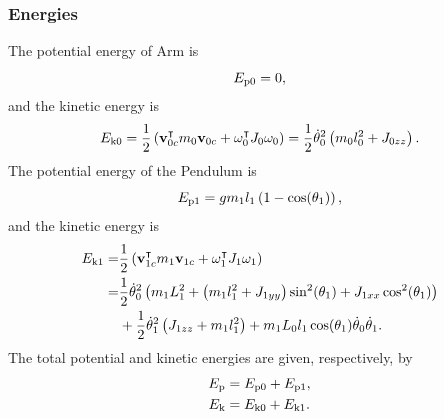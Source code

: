 \subsubsection{Energies}
The potential energy of Arm is
\begin{equation}
	E _{\text{p0}} = 0,
\end{equation}
and the kinetic energy is
\begin{equation}
	E _{\text{k0}} = \frac{1}{2}\left( \text{\textbf{v}}_{0c}^\intercal m_0\textbf{v}_{0c} + \omega_0^\intercal J_0\omega_0  \right) = 
	\frac{1}{2}\dot{\theta}_0^2\left(  m_0l_0^2+J_{0zz}  \right).
\end{equation}
The potential energy of the Pendulum is
\begin{equation}
E _{\text{p1}} = gm_1l_1\left( 1-\cos(\theta_1) \right),
\end{equation}
and the kinetic energy is
\begin{equation}
\begin{split}
	E _{\text{k1}} = &\frac{1}{2}\left( \text{\textbf{v}}_{1c}^\intercal m_1\textbf{v}_{1c} + \omega_1^\intercal J_1\omega_1  \right)\\
	= &\frac{1}{2}\dot{\theta}_0^2\left( m_1L_1^2+\left( m_1l_1^2+J_{1yy} \right)\sin^2(\theta_1)+J_{1xx}\cos^2(\theta_1) \right)\\
	&+\frac{1}{2}\dot{\theta}_1^2\left(  J_{1zz}+m_1l_1^2  \right)+m_1L_0l_1\cos(\theta_1)\dot{\theta}_0\dot{\theta}_1.
\end{split}
\end{equation}
The total potential and kinetic energies are given, respectively, by
\begin{subequations}
	\begin{align}
		E _{\text{p}} &= E _{\text{p0}} + E _{\text{p1}}, \\
		E _{\text{k}} &= E _{\text{k0}} + E _{\text{k1}}.
	\end{align}
\end{subequations}
